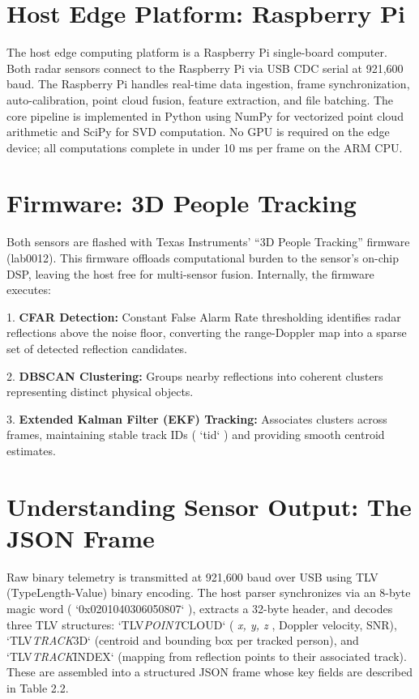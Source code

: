 \section{Host Edge Platform: Raspberry Pi}

The host edge computing platform is a Raspberry Pi single-board computer. Both radar sensors connect to the Raspberry Pi via USB CDC serial at 921,600 baud. The Raspberry Pi handles real-time data ingestion, frame synchronization, auto-calibration, point cloud fusion, feature extraction, and file batching. The core pipeline is implemented in Python using NumPy for vectorized point cloud arithmetic and SciPy for SVD computation. No GPU is required on the edge device; all computations complete in under 10 ms per frame on the ARM CPU. 

\section{Firmware: 3D People Tracking}

Both sensors are flashed with Texas Instruments' ``3D People Tracking'' firmware (lab0012). This firmware offloads computational burden to the sensor's on-chip DSP, leaving the host free for multi-sensor fusion. Internally, the firmware executes: 

1. \textbf{CFAR Detection:} Constant False Alarm Rate thresholding identifies radar reflections above the noise floor, converting the range-Doppler map into a sparse set of detected reflection candidates. 

2. \textbf{DBSCAN Clustering:} Groups nearby reflections into coherent clusters representing distinct physical objects. 

3. \textbf{Extended Kalman Filter (EKF) Tracking:} Associates clusters across frames, maintaining stable track IDs ( `tid` ) and providing smooth centroid estimates. 

\section{Understanding Sensor Output: The JSON Frame}

Raw binary telemetry is transmitted at 921,600 baud over USB using TLV (TypeLength-Value) binary encoding. The host parser synchronizes via an 8-byte magic word ( `0x0201040306050807` ), extracts a 32-byte header, and decodes three TLV structures: `TLV\textit{POINT}CLOUD` ( \textit{x, y, z} , Doppler velocity, SNR), `TLV\textit{TRACK}3D` (centroid and bounding box per tracked person), and `TLV\textit{TRACK}INDEX` (mapping from reflection points to their associated track). These are assembled into a structured JSON frame whose key fields are described in Table 2.2. 



